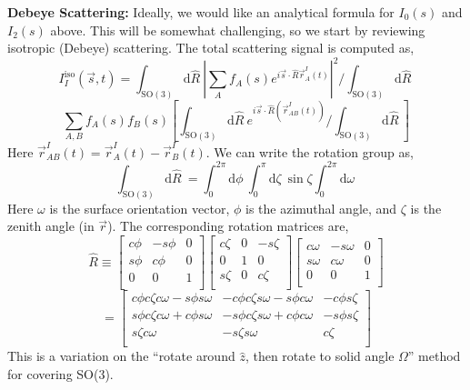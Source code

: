 \documentclass[fleqn,oneside,12pt]{article}
\begin{document}
\textbf{Debeye Scattering:} Ideally, we would like an analytical formula for
$I_{0} (s)$ and $I_{2} (s)$ above. This will be somewhat challenging, so we
start by reviewing isotropic (Debeye) scattering. The total scattering signal is
computed as, 
\[
I_{I}^{\mathrm{iso}} (\vec s, t)
=
\int_{\mathrm{SO(3)}}
\mathrm{d} \hat R \
\left |
\sum_{A}
f_{A} (s)
e^{i \vec s \cdot \hat R \vec r_{A}^{I} (t)}
\right |^2
/ 
\int_{\mathrm{SO(3)}}
\mathrm{d} \hat R \
\]
\[
\sum_{A,B}
f_{A} (s)
f_{B} (s)
\left [
\int_{\mathrm{SO(3)}}
\mathrm{d} \hat R \
e^{i \vec s \cdot \hat R (\vec r_{AB}^{I} (t))}
/
\int_{\mathrm{SO(3)}}
\mathrm{d} \hat R \
\right ]
\]
Here $\vec r_{AB}^{I} (t) = \vec r_{A}^{I} (t) - \vec r_{B}^{I} (t)$. We can
write the rotation group as,
\[
\int_{\mathrm{SO(3)}}
\mathrm{d} \hat R \
=
\int_{0}^{2 \pi}
\mathrm{d} \phi \
\int_{0}^{\pi}
\mathrm{d} \zeta \
\sin \zeta
\int_{0}^{2 \pi}
\mathrm{d} \omega \
\]
Here $\omega$ is the surface orientation vector, $\phi$ is the azimuthal angle,
and $\zeta$ is the zenith angle (in $\vec r$).  The corresponding rotation
matrices are,
\[
\hat R
\equiv
\left [
\begin{array}{ccc}
c \phi & -s \phi & 0 \\
s \phi & c \phi & 0 \\
0 & 0 & 1 \\
\end{array}
\right ]
\left [
\begin{array}{ccc}
c \zeta & 0 & -s \zeta \\
0 & 1 & 0 \\
s \zeta & 0 & c \zeta \\
\end{array}
\right ]
\left [
\begin{array}{ccc}
c \omega & -s \omega & 0 \\
s \omega & c \omega & 0 \\
0 & 0 & 1 \\
\end{array}
\right ]
\]
\[
=
\left [
\begin{array}{ccc}
c \phi c \zeta c \omega - s \phi s \omega & -c \phi c \zeta s \omega - s \phi c
\omega & - c \phi s \zeta \\
s \phi c \zeta c \omega + c \phi s \omega & -s \phi c \zeta s \omega + c \phi c
\omega & - s \phi s \zeta \\
s \zeta c \omega & - s \zeta s \omega & c \zeta \\
\end{array}
\right ]
\]
This is a variation on the ``rotate around $\hat z$, then rotate to solid angle
$\Omega$'' method for covering SO(3).
\end{document}

